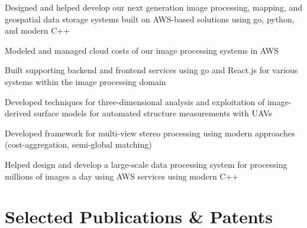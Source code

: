 \documentclass[]{nilosek-resume}
\begin{document}
\begin{minipage}[t]{0.7\textwidth}
\vspace{\topsep} %
\begin{tightemize}
	\item Designed and helped develop our next generation image processing, mapping, and geospatial data storage systems built on AWS-based solutions using go, python, and modern C++
	\item Modeled and managed cloud costs of our image processing systems in AWS
	\item Built supporting backend and frontend services using go and React.js for various systems within the image processing domain
\end{tightemize}
\sectionsep

\begin{tightemize}
	\item Developed techniques for three-dimensional analysis and exploitation of image-derived surface models for automated structure measurements with UAVs
	\item Developed framework for multi-view stereo processing using modern approaches (cost-aggregation, semi-global matching)
	\item Helped design and develop a large-scale data processing system for processing millions of images a day using AWS services using modern C++
\end{tightemize}
\sectionsep


\section{Selected Publications \& Patents}
\renewcommand\refname{\vskip - 0.8cm} %


\nocite{*}


\end{minipage} 
\end{document}
